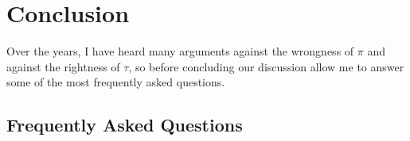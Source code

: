 




\section{Conclusion}
\label{sec:conclusion}

Over the years, I have heard many arguments against the wrongness of $\pi$ and against the rightness of $\tau$, so before concluding our discussion allow me to answer some of the most frequently asked questions.

  \subsection{Frequently Asked Questions} %
  \label{sec:faq}

